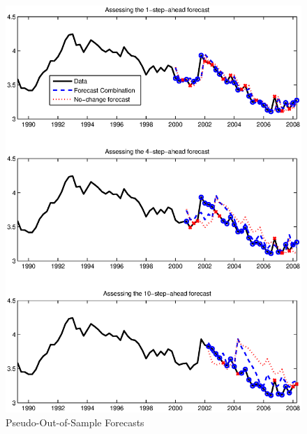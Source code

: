 \documentclass[11pt]{article}
\begin{document}
\clearpage
\begin{figure}
\flushleft
\caption{Pseudo-Out-of-Sample Forecasts} \label{figure_forecasts}
 \includegraphics[scale=0.85]{figure_forecasts.ps}
\end{figure}
\end{document}
